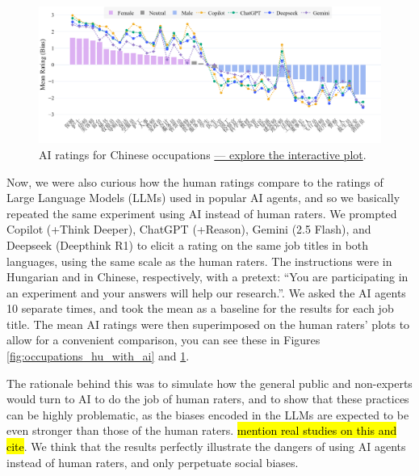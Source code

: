 \documentclass[11pt]{article}
\begin{document}
\begin{figure}[]
  \centering
  \includegraphics[width=\linewidth]{../occupations_zh_with_ai}
  \caption{AI ratings for Chinese occupations \href{https://htmlpreview.github.io/?https://github.com/partigabor/occupational-bias/blob/main/occupations_zh_with_ai.html}{--- explore the interactive plot}.}
  \label{fig:occupations_zh_with_ai}
\end{figure}


Now, we were also curious how the human ratings compare to the ratings of Large Language Models (LLMs) used in popular AI agents, and so we basically repeated the same experiment using AI instead of human raters. We prompted Copilot (+Think Deeper), ChatGPT (+Reason), Gemini (2.5 Flash), and Deepseek (Deepthink R1) to elicit a rating on the same job titles in both languages, using the same scale as the human raters. The instructions were in Hungarian and in Chinese, respectively, with a pretext: ``You are participating in an experiment and your answers will help our research.''. We asked the AI agents 10 separate times, and took the mean as a baseline for the results for each job title. The mean AI ratings were then superimposed on the human raters' plots to allow for a convenient comparison, you can see these in Figures \ref{fig:occupations_hu_with_ai} and \ref{fig:occupations_zh_with_ai}.

The rationale behind this was to simulate how the general public and non-experts would turn to AI to do the job of human raters, and to show that these practices can be highly problematic, as the biases encoded in the LLMs are expected to be even stronger than those of the human raters. \hl{mention real studies on this and cite}. We think that the results perfectly illustrate the dangers of using AI agents instead of human raters, and only perpetuate social biases.



\end{document}
